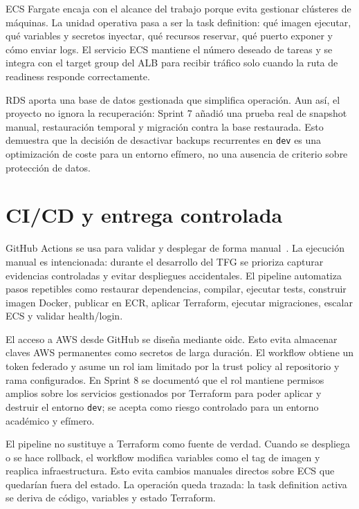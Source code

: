 ECS Fargate encaja con el alcance del trabajo porque evita gestionar clústeres de máquinas. La unidad operativa pasa a ser la task definition: qué imagen ejecutar, qué variables y secretos inyectar, qué recursos reservar, qué puerto exponer y cómo enviar logs. El servicio ECS mantiene el número deseado de tareas y se integra con el target group del ALB para recibir tráfico solo cuando la ruta de readiness responde correctamente.

RDS aporta una base de datos gestionada que simplifica operación. Aun así, el proyecto no ignora la recuperación: Sprint 7 añadió una prueba real de snapshot manual, restauración temporal y migración contra la base restaurada. Esto demuestra que la decisión de desactivar backups recurrentes en \texttt{dev} es una optimización de coste para un entorno efímero, no una ausencia de criterio sobre protección de datos.

\section{CI/CD y entrega controlada}
\label{sec:marco-cicd}

GitHub Actions se usa para validar y desplegar de forma manual~\cite{GithubActionsDocs}. La ejecución manual es intencionada: durante el desarrollo del TFG se prioriza capturar evidencias controladas y evitar despliegues accidentales. El pipeline automatiza pasos repetibles como restaurar dependencias, compilar, ejecutar tests, construir imagen Docker, publicar en ECR, aplicar Terraform, ejecutar migraciones, escalar ECS y validar health/login.

El acceso a AWS desde GitHub se diseña mediante \acrshort{oidc}. Esto evita almacenar claves AWS permanentes como secretos de larga duración. El workflow obtiene un token federado y asume un rol \acrshort{iam} limitado por la trust policy al repositorio y rama configurados. En Sprint 8 se documentó que el rol mantiene permisos amplios sobre los servicios gestionados por Terraform para poder aplicar y destruir el entorno \texttt{dev}; se acepta como riesgo controlado para un entorno académico y efímero.

El pipeline no sustituye a Terraform como fuente de verdad. Cuando se despliega o se hace rollback, el workflow modifica variables como el tag de imagen y reaplica infraestructura. Esto evita cambios manuales directos sobre ECS que quedarían fuera del estado. La operación queda trazada: la task definition activa se deriva de código, variables y estado Terraform.

